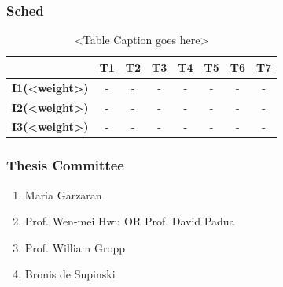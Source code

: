 \begin{frame}
\frametitle{Sched} 
\begin{table}[h!]
  \begin{center}
    \small
    \begin{tabular}{ | c || c | c | c | c | c | c | c |}
      \hline
      & \underline{T1} & \underline{T2} & \underline{T3} & \underline{T4} & \underline{T5} & \underline{T6} & \underline{T7} \\ 
      \hline
      \tiny \textbf{I1(<weight>)}  &  \tiny - &\tiny -  & \tiny - & \tiny -  & \tiny -  & \tiny - & \tiny - \\ 
     \hline
      \tiny \textbf{I2(<weight>)}  &  \tiny - &\tiny -  & \tiny - & \tiny -  & \tiny -  & \tiny - & \tiny - \\ 
      \hline
      \tiny \textbf{I3(<weight>)}  &  \tiny - &\tiny -  & \tiny - & \tiny -  & \tiny -  & \tiny - & \tiny - \\ 
      \hline
    \end{tabular}
  \end{center}
  \caption{<Table Caption goes here>}
\end{table}
\end{frame} 


\begin{frame} 
\frametitle{Thesis Committee} 
\begin{enumerate}
\item \small Maria Garzaran 
\item \small Prof. Wen-mei Hwu OR Prof. David Padua
\item \small Prof. William Gropp
\item \small  Bronis de Supinski
\end{enumerate}
\end{frame} 

